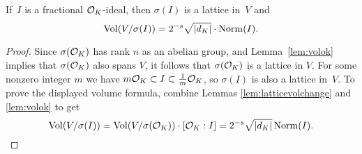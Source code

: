 \begin{lemma}\label{lem:volfracideal}
If~$I$ is a  fractional $\mathcal{O}_K$-ideal, then $\sigma(I)$ is
a lattice in~$V$ and
\[
\operatorname{Vol}(V/\sigma(I)) = 2^{-s}\sqrt{|d_K|}\cdot \operatorname{Norm}(I).
\]
\end{lemma}
\begin{proof}
Since $\sigma(\mathcal{O}_K)$ has rank $n$ as an abelian group, and
Lemma~\ref{lem:volok} implies that $\sigma(\mathcal{O}_K)$ also spans $V$,
it follows that $\sigma(\mathcal{O}_K)$ is a lattice in $V$.
For some nonzero integer $m$ we have
$m\mathcal{O}_K \subset I \subset \frac{1}{m}\mathcal{O}_K$,
so $\sigma(I)$ is also a lattice in~$V$.
To prove the displayed volume
formula, combine Lemmas
\ref{lem:latticevolchange} and \ref{lem:volok} to get
\[
\operatorname{Vol}(V/\sigma(I)) = \operatorname{Vol}(V/\sigma(\mathcal{O}_K))\cdot[\mathcal{O}_K:I]
         =2^{-s}\sqrt{|d_K|}\operatorname{Norm}(I).
\]
\end{proof}


